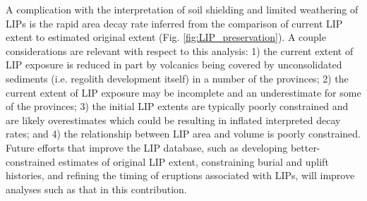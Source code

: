 \documentclass[11pt,letterpaper]{article}
\begin{document}
A complication with the interpretation of soil shielding and limited weathering of LIPs is the rapid area decay rate inferred from the comparison of current LIP extent to estimated original extent (Fig. \ref{fig:LIP_preservation}). A couple considerations are relevant with respect to this analysis: 1) the current extent of LIP exposure is reduced in part by volcanics being covered by unconsolidated sediments (i.e. regolith development itself) in a number of the provinces; 2) the current extent of LIP exposure may be incomplete and an underestimate for some of the provinces; 3) the initial LIP extents are typically poorly constrained and are likely overestimates which could be resulting in inflated interpreted decay rates; and 4) the relationship between LIP area and volume is poorly constrained. Future efforts that improve the LIP database, such as developing better-constrained estimates of original LIP extent, constraining burial and uplift histories, and refining the timing of eruptions associated with LIPs, will improve analyses such as that in this contribution.
\end{document}
